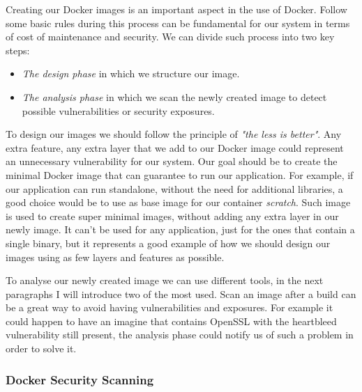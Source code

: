 \documentclass[a4paper,12pt]{article}
\begin{document}
Creating our Docker images is an important aspect in the use of Docker. Follow
some basic rules during this process can be fundamental for our system in terms
of cost of maintenance and security. We can divide such process into two key
steps: 
\begin{itemize}
  \item \textit{The design phase} in which we structure our image.
  \item \textit{The analysis phase} in which we scan the newly created image to
  detect possible vulnerabilities or security exposures.
\end{itemize}
To design our images we should follow the principle of \textit{"the less is
better"}. Any extra feature, any extra layer that we add to our Docker image
could represent an unnecessary vulnerability for our system. Our goal should be
to create the minimal Docker image that can guarantee to run our application.
For example, if our application can run standalone, without the need for
additional libraries, a good choice would be to use as base image for our
container \textit{scratch}. Such image is used to create super minimal images,
without adding any extra layer in our newly image. It can't be used for any
application, just for the ones that contain a single binary, but it represents
a good example of how we should design our images using as few layers and
features as possible. \par To analyse our newly created image we can use
different tools, in the next paragraphs I will introduce two of the most used.
Scan an image after a build can be a great way to avoid having vulnerabilities
and exposures. For example it could happen to have an imagine that contains
OpenSSL with the heartbleed vulnerability still present, the analysis phase
could notify us of such a problem in order to solve it. 

\subsubsection{Docker Security Scanning}
\end{document}

